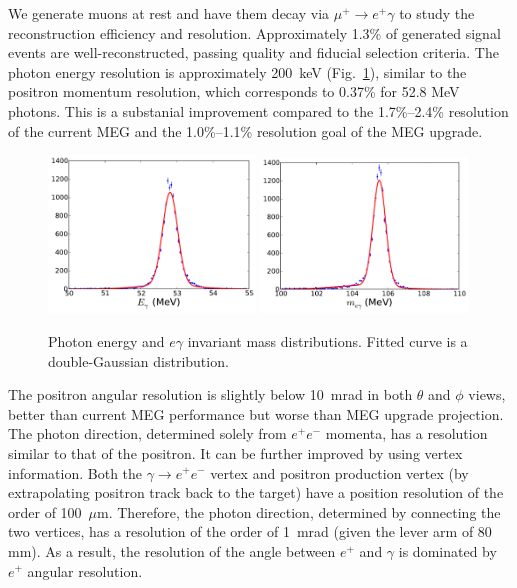 We generate muons at rest and have them decay via $\mu^+\to e^+\gamma$
to study the reconstruction efficiency and resolution. 
Approximately 1.3\% of generated signal events are well-reconstructed, 
passing quality and fiducial selection criteria. The photon energy resolution 
is approximately 200~keV (Fig.~\ref{fig:eresol}), similar to the positron momentum
resolution, which 
corresponds to 0.37\% for 52.8 MeV photons. This is a substanial improvement compared 
to the 1.7\%--2.4\% resolution of the current MEG and the 1.0\%--1.1\% resolution 
goal of the MEG upgrade. 

\begin{figure}[ht]
\centering
\includegraphics[width=0.49\textwidth]{Figures/egamma-resol-fit2b.pdf}
\includegraphics[width=0.49\textwidth]{Figures/mumass-resol-fit2b.pdf}
\caption{\label{fig:eresol} Photon energy and $e\gamma$ invariant
mass distributions. Fitted curve is a double-Gaussian distribution.}
\end{figure}


The positron angular resolution is slightly below 10~mrad in both $\theta$ 
and $\phi$ views,
better than current MEG performance but worse than MEG upgrade projection.
The photon direction, determined solely from $e^+e^-$ momenta, has a resolution
similar to that of the positron. It can be further improved  by using
vertex information. Both the  $\gamma\to e^+e^-$ vertex and positron production vertex
(by extrapolating positron track back to the target) have a position resolution
of the order of 100~$\mu$m. Therefore, the photon direction, determined by connecting the two
vertices, has a resolution of the order of 1~mrad (given the lever arm of 80 mm).
As a result, the resolution of the angle between $e^+$ and $\gamma$ is dominated
by $e^+$ angular resolution.

